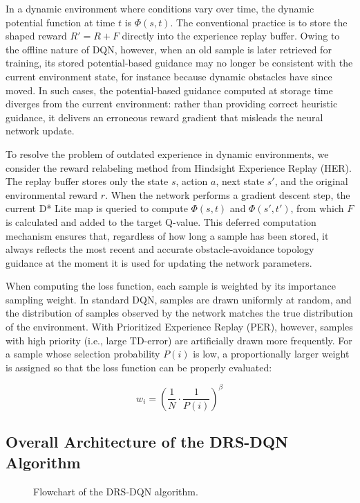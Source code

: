 In a dynamic environment where conditions vary over time, the dynamic potential function at time $t$ is $\Phi(s, t)$. The conventional practice is to store the shaped reward $R' = R + F$ directly into the experience replay buffer. Owing to the offline nature of DQN, however, when an old sample is later retrieved for training, its stored potential-based guidance may no longer be consistent with the current environment state, for instance because dynamic obstacles have since moved. In such cases, the potential-based guidance computed at storage time diverges from the current environment: rather than providing correct heuristic guidance, it delivers an erroneous reward gradient that misleads the neural network update.

To resolve the problem of outdated experience in dynamic environments, we consider the reward relabeling method from Hindsight Experience Replay (HER). The replay buffer stores only the state $s$, action $a$, next state $s'$, and the original environmental reward $r$. When the network performs a gradient descent step, the current D* Lite map is queried to compute $\Phi(s, t)$ and $\Phi(s', t')$, from which $F$ is calculated and added to the target Q-value. This deferred computation mechanism ensures that, regardless of how long a sample has been stored, it always reflects the most recent and accurate obstacle-avoidance topology guidance at the moment it is used for updating the network parameters.

When computing the loss function, each sample is weighted by its importance sampling weight. In standard DQN, samples are drawn uniformly at random, and the distribution of samples observed by the network matches the true distribution of the environment. With Prioritized Experience Replay (PER), however, samples with high priority (i.e., large TD-error) are artificially drawn more frequently. For a sample whose selection probability $P(i)$ is low, a proportionally larger weight is assigned so that the loss function can be properly evaluated:

\begin{equation}
w_i = \left( \frac{1}{N} \cdot \frac{1}{P(i)} \right)^{\beta}
\end{equation}

\subsection{Overall Architecture of the DRS-DQN Algorithm}

\begin{figure}[htbp]
\centering
\caption{Flowchart of the DRS-DQN algorithm.}
\label{fig:drs-dqn-flowchart}
\end{figure}

